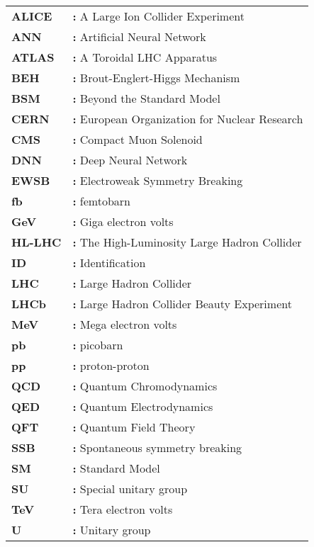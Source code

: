 \begin{tabular}{@{}p{2cm}l}
{\bf ALICE} & {\bf:} A Large Ion Collider Experiment\\
{\bf ANN} & {\bf:} Artificial Neural Network\\
{\bf ATLAS} & {\bf:} A Toroidal LHC Apparatus\\
{\bf BEH} & {\bf:} Brout-Englert-Higgs Mechanism\\
{\bf BSM} & {\bf:} Beyond the Standard Model\\
{\bf CERN} & {\bf:} European Organization for Nuclear Research\\
{\bf CMS} & {\bf:} Compact Muon Solenoid\\
{\bf DNN} & {\bf:} Deep Neural Network\\
{\bf EWSB} & {\bf:} Electroweak Symmetry Breaking\\
{\bf fb} & {\bf:} femtobarn\\
{\bf GeV} & {\bf:} Giga electron volts\\
{\bf HL-LHC} & {\bf:} The High-Luminosity Large Hadron Collider\\
{\bf ID} & {\bf:} Identification\\
{\bf LHC} & {\bf:} Large Hadron Collider\\
{\bf LHCb} & {\bf:} Large Hadron Collider Beauty Experiment\\
{\bf MeV} & {\bf:} Mega electron volts\\
{\bf pb} & {\bf:} picobarn\\
{\bf pp} & {\bf:} proton-proton\\
{\bf QCD} & {\bf:} Quantum Chromodynamics\\
{\bf QED} & {\bf:} Quantum Electrodynamics\\
{\bf QFT} & {\bf:} Quantum Field Theory\\
{\bf SSB} & {\bf:} Spontaneous symmetry breaking\\
{\bf SM} & {\bf:} Standard Model\\
{\bf SU} & {\bf:} Special unitary group\\
{\bf TeV} & {\bf:} Tera electron volts\\
{\bf U} & {\bf:} Unitary group\\
\end{tabular}

